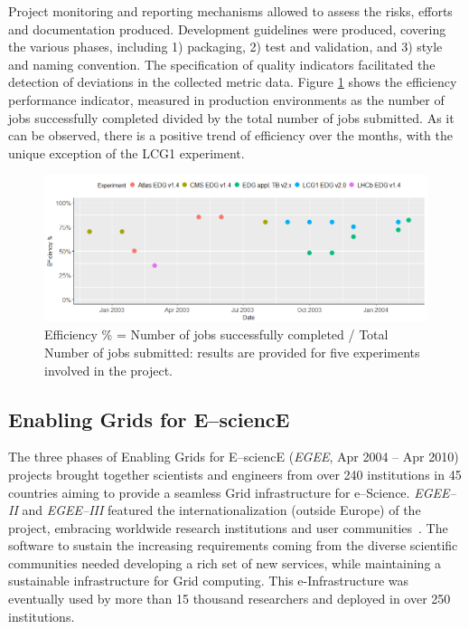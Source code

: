 Project monitoring and reporting mechanisms allowed to assess the risks, efforts and documentation
produced. Development guidelines \cite{datagridguide} were produced, covering the various phases, including
1) packaging, 2) test and validation, and 3) style and naming convention. The specification of quality indicators
\cite{datagridindicators} facilitated the detection of deviations in the collected metric data. Figure
\ref{fig:efficiency} shows the efficiency performance indicator, measured in production environments as the
number of jobs successfully completed divided by the total number of jobs submitted. As it can be observed,
there is a positive trend of efficiency over the months, with the unique exception of the LCG1 experiment.
\begin{figure}[h]
\centering
\includegraphics[width=1\textwidth]{images/datagridEff.png}
\caption{Efficiency \% = Number of jobs successfully completed / Total Number of jobs submitted: results are provided for five experiments involved in the project.}
\label{fig:efficiency}
\end{figure}

\subsection{Enabling Grids for E--sciencE}

The three phases of Enabling Grids for E--sciencE ({\sl EGEE}, Apr 2004 -- Apr 2010)
\cite{cordis:egee,cordis:egee2,cordis:egee3} projects brought together
scientists and engineers from over 240 institutions in 45 countries aiming to
provide a seamless Grid infrastructure for e--Science. {\sl EGEE--II} and {\sl EGEE--III}
featured the internationalization (outside Europe) of the project, embracing worldwide research
institutions and user communities~\cite{egee}. The software to sustain the increasing
requirements coming from the diverse scientific communities needed developing a
rich set of new services, while maintaining a sustainable infrastructure for
Grid computing. This e-Infrastructure was eventually used by more than 15 thousand researchers
and deployed in over 250 institutions.

